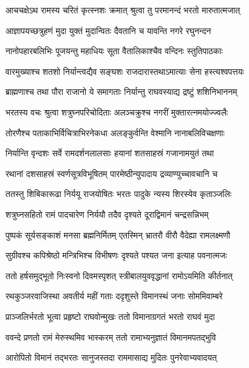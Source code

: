 \twolineshloka
{आचचक्षेऽथ रामस्य चरितं कृत्स्नशः क्रमात्}
{श्रुत्वा तु परमानन्दं भरतो मारुतात्मजात्} %

\twolineshloka
{आज्ञापयच्छत्रुहणं मुदा युक्तं मुदान्वितः}
{दैवतानि च यावन्ति नगरे रघुनन्दन} %

\twolineshloka
{नानोपहारबलिभिः पूजयन्तु महाधियः}
{सूता वैतालिकाश्चैव वन्दिनः स्तुतिपाठकाः} %

\twolineshloka
{वारमुख्याश्च शतशो निर्यान्त्वद्यैव सङ्घशः}
{राजदारास्तथाऽमात्याः सेना हस्त्यश्वपत्तयः} %

\twolineshloka
{ब्राह्मणाश्च तथा पौरा राजानो ये समागताः}
{निर्यान्तु राघवस्याद्य द्रष्टुं शशिनिभाननम्} %

\twolineshloka
{भरतस्य वचः श्रुत्वा शत्रुघ्नपरिचोदिताः}
{अलञ्चक्रुश्च नगरीं मुक्तारत्नमयोज्ज्वलैः} %

\twolineshloka
{तोरणैश्च पताकाभिर्विचित्राभिरनेकधा}
{अलङ्कुर्वन्ति वेश्मानि नानाबलिविचक्षणाः} %

\twolineshloka
{निर्यान्ति वृन्दशः सर्वे रामदर्शनलालसाः}
{हयानां शतसाहस्रं गजानामयुतं तथा} %

\twolineshloka
{रथानां दशसाहस्रं स्वर्णसूत्रविभूषितम्}
{पारमेष्ठीन्युपादाय द्रव्याण्युच्चावचानि च} %

\twolineshloka
{ततस्तु शिबिकारूढा निर्ययू राजयोषितः}
{भरतः पादुके न्यस्य शिरस्येव कृताञ्जलिः} %

\twolineshloka
{शत्रुघ्नसहितो रामं पादचारेण निर्ययौ}
{तदैव दृश्यते दूराद्विमानं चन्द्रसन्निभम्} %

\twolineshloka
{पुष्पकं सूर्यसङ्काशं मनसा ब्रह्मनिर्मितम्}
{एतस्मिन् भ्रातरौ वीरौ वैदेह्या रामलक्ष्मणौ} %

\twolineshloka
{सुग्रीवश्च कपिश्रेष्ठो मन्त्रिभिश्च विभीषणः}
{दृश्यते पश्यत जना इत्याह पवनात्मजः} %

\twolineshloka
{ततो हर्षसमुद्भूतो निःस्वनो दिवमस्पृशत्}
{स्त्रीबालयुववृद्धानां रामोऽयमिति कीर्तनात्} %

\twolineshloka
{रथकुञ्जरवाजिस्था अवतीर्य महीं गताः}
{ददृशुस्ते विमानस्थं जनाः सोममिवाम्बरे} %

\twolineshloka
{प्राञ्जलिर्भरतो भूत्वा प्रहृष्टो राघवोन्मुखः}
{ततो विमानाग्रगतं भरतो राघवं मुदा} %

\twolineshloka
{ववन्दे प्रणतो रामं मेरुस्थमिव भास्करम्}
{ततो रामाभ्यनुज्ञातं विमानमपतद्भुवि} %

\twolineshloka
{आरोपितो विमानं तद्भरतः सानुजस्तदा}
{राममासाद्य मुदितः पुनरेवाभ्यवादयत्} %


